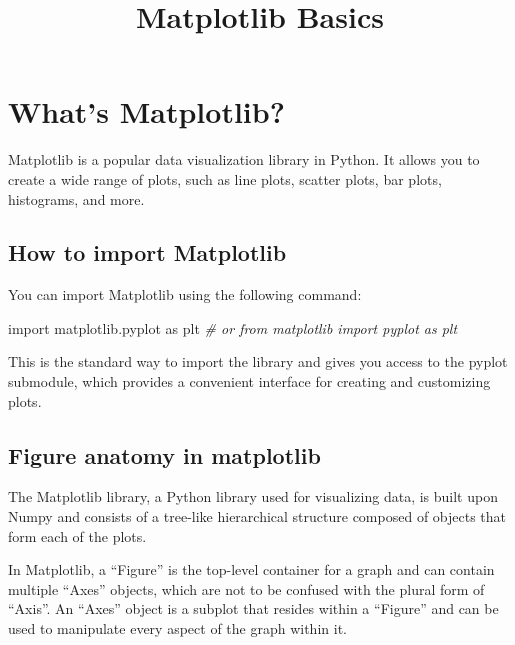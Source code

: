 \documentclass[11pt]{article}
\title{Matplotlib Basics}
\date{}
\newenvironment{Shaded}{}{}
\newcommand{\CommentTok}[1]{\textcolor[rgb]{0.38,0.63,0.69}{\textit{{#1}}}}
\newcommand{\NormalTok}[1]{{#1}}
\newcommand{\ImportTok}[1]{{#1}}
\begin{document}
    
    \maketitle
    \vspace*{-1cm}
    \hypertarget{whats-matplotlib}{%
\section{What's Matplotlib?}\label{whats-matplotlib}}

Matplotlib is a popular data visualization library in Python. It allows
you to create a wide range of plots, such as line plots, scatter plots,
bar plots, histograms, and more.

\hypertarget{how-to-import-matplotlib}{%
\subsection{How to import
Matplotlib}\label{how-to-import-matplotlib}}

You can import Matplotlib using the following command:

\begin{Shaded}
\begin{Highlighting}[]
\ImportTok{import}\NormalTok{ matplotlib.pyplot }\ImportTok{as}\NormalTok{ plt}
\CommentTok{\# or from matplotlib import pyplot as plt}
\end{Highlighting}
\end{Shaded}

This is the standard way to import the library and gives you access to
the pyplot submodule, which provides a convenient interface for creating
and customizing plots.

\hypertarget{Figure-anatomy-in-matplotlib}{%
\subsection{Figure anatomy in matplotlib }\label{Figure-anatomy-in-matplotlib}}
The Matplotlib library, a Python library used for visualizing data, is built upon Numpy
and consists of a tree-like hierarchical structure composed of objects
that form each of the plots.

In Matplotlib, a ``Figure'' is the top-level container for a graph and
can contain multiple ``Axes'' objects, which are not to be confused with
the plural form of ``Axis''. An ``Axes'' object is a subplot that
resides within a ``Figure'' and can be used to manipulate every aspect
of the graph within it.
\end{document}
